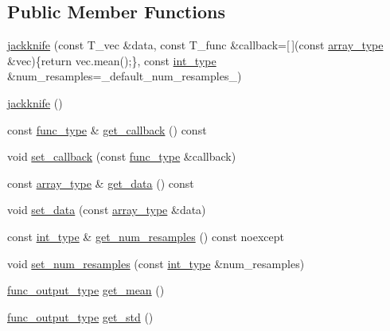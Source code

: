 \subsection*{Public Member Functions}
\begin{DoxyCompactItemize}
\item 
\hyperlink{classIceBRG_1_1jackknife_ab87402dec3d7de00bf60cfe19d2bf195}{jackknife} (const T\+\_\+vec \&data, const T\+\_\+func \&callback=\mbox{[}$\,$\mbox{]}(const \hyperlink{classIceBRG_1_1jackknife_ad2892a939f8fc89723db89ac837317be}{array\+\_\+type} \&vec)\{return vec.\+mean();\}, const \hyperlink{lib_2IceBRG__main_2common_8h_ac4de9d9335536ac22821171deec8d39e}{int\+\_\+type} \&num\+\_\+resamples=\+\_\+default\+\_\+num\+\_\+resamples\+\_\+)
\item 
\hyperlink{classIceBRG_1_1jackknife_aba85e962f5b9becab351894c21d0c056}{jackknife} ()
\item 
const \hyperlink{classIceBRG_1_1jackknife_a3399a8fe403193ec9f56ef991dcbfce2}{func\+\_\+type} \& \hyperlink{classIceBRG_1_1jackknife_a643ad793ebc2b214f6a13342fadfc47a}{get\+\_\+callback} () const 
\item 
void \hyperlink{classIceBRG_1_1jackknife_a1cf7aba18cb9f506b0f47985cb365666}{set\+\_\+callback} (const \hyperlink{classIceBRG_1_1jackknife_a3399a8fe403193ec9f56ef991dcbfce2}{func\+\_\+type} \&callback)
\item 
const \hyperlink{classIceBRG_1_1jackknife_ad2892a939f8fc89723db89ac837317be}{array\+\_\+type} \& \hyperlink{classIceBRG_1_1jackknife_af70af47b98a1b0fe2f5c747f65227078}{get\+\_\+data} () const 
\item 
void \hyperlink{classIceBRG_1_1jackknife_a267913efacadadadc0205238ce943815}{set\+\_\+data} (const \hyperlink{classIceBRG_1_1jackknife_ad2892a939f8fc89723db89ac837317be}{array\+\_\+type} \&data)
\item 
const \hyperlink{lib_2IceBRG__main_2common_8h_ac4de9d9335536ac22821171deec8d39e}{int\+\_\+type} \& \hyperlink{classIceBRG_1_1jackknife_a9f8fbf1baa67a41be4f01206095ef7a0}{get\+\_\+num\+\_\+resamples} () const  noexcept
\item 
void \hyperlink{classIceBRG_1_1jackknife_a02369d76326d80f4be3e2c9e25a5ae5a}{set\+\_\+num\+\_\+resamples} (const \hyperlink{lib_2IceBRG__main_2common_8h_ac4de9d9335536ac22821171deec8d39e}{int\+\_\+type} \&num\+\_\+resamples)
\item 
\hyperlink{classIceBRG_1_1jackknife_a1b24a65a9543f5708c9fc895620c031b}{func\+\_\+output\+\_\+type} \hyperlink{classIceBRG_1_1jackknife_a44707243682f3c068baa7e94ae96f463}{get\+\_\+mean} ()
\item 
\hyperlink{classIceBRG_1_1jackknife_a1b24a65a9543f5708c9fc895620c031b}{func\+\_\+output\+\_\+type} \hyperlink{classIceBRG_1_1jackknife_a62db452d89c776879d6488aee2532c45}{get\+\_\+std} ()
\end{DoxyCompactItemize}
